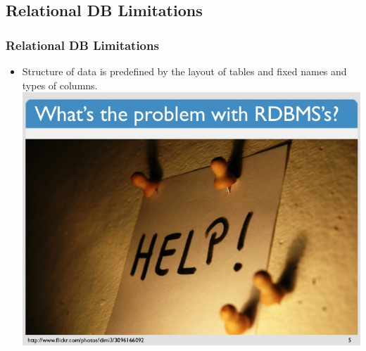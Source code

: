 \documentclass{beamer}
\begin{document}
\subsection[]{Relational DB Limitations}
\begin{frame}\frametitle{Relational DB Limitations}
\begin{itemize}\vspace{0.5cm}
\item Structure of data is predefined by the layout of tables and fixed names and types of columns.
\newline
\includegraphics[scale=.30]{slide-12-728.jpg}
\end{itemize}
\end{frame}
\end{document}
